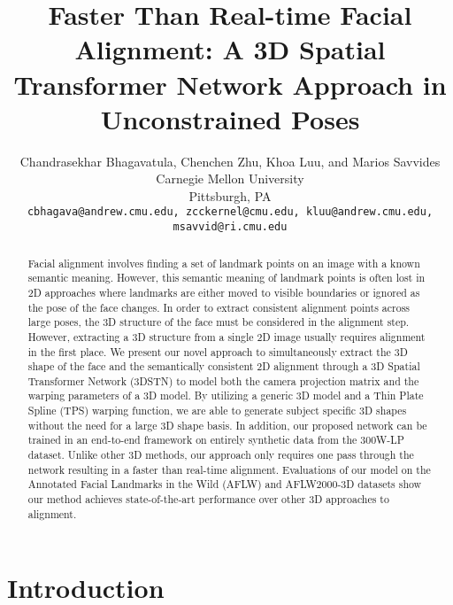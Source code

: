 \documentclass[10pt,twocolumn,letterpaper]{article}
\begin{document}
\title{Faster Than Real-time Facial Alignment: A 3D Spatial Transformer Network Approach in Unconstrained Poses}
\author{Chandrasekhar Bhagavatula, Chenchen Zhu, Khoa Luu, and Marios Savvides\\
Carnegie Mellon University\\
Pittsburgh, PA\\
{\tt\small cbhagava@andrew.cmu.edu, zcckernel@cmu.edu, kluu@andrew.cmu.edu,  msavvid@ri.cmu.edu}
}

\maketitle


\begin{abstract}
Facial alignment involves finding a set of landmark points on an image with a known semantic meaning. However, this semantic meaning of landmark points is often lost in 2D approaches where landmarks are either moved to visible boundaries or ignored as the pose of the face changes. In order to extract consistent alignment points across large poses, the 3D structure of the face must be considered in the alignment step. However, extracting a 3D structure from a single 2D image usually requires alignment in the first place. We present our novel approach to simultaneously extract the 3D shape of the face and the semantically consistent 2D alignment through a 3D Spatial Transformer Network (3DSTN) to model both the camera projection matrix and the warping parameters of a 3D model. By utilizing a generic 3D model and a Thin Plate Spline (TPS) warping function, we are able to generate subject specific 3D shapes without the need for a large 3D shape basis. In addition, our proposed network can be trained in an end-to-end framework on entirely synthetic data from the 300W-LP dataset. Unlike other 3D methods, our approach only requires one pass through the network resulting in a faster than real-time alignment. Evaluations of our model on the Annotated Facial Landmarks in the Wild (AFLW) and AFLW2000-3D datasets show our method achieves state-of-the-art performance over other 3D approaches to alignment.
\end{abstract}

\section{Introduction}
\end{document}
